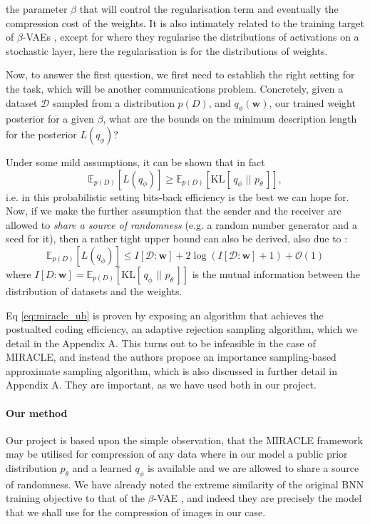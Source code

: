 \documentclass{article}
\renewcommand{\vec}[1]{\mathbf{#1}}
\newcommand{\Oh}{\mathcal{O}}
\newcommand{\KL}[2]{\mathrm{KL}[\,#1\,\,||\,\,#2\,]}
\newcommand{\Exp}{\mathbb{E}}
\newcommand{\Data}{\mathcal{D}}
\begin{document}
the parameter $\beta$ that will control the regularisation term and eventually
the compression cost of the weights. It is also intimately related to the
training target of $\beta$-VAEs \cite{higgins2017beta}, except for where they
regularise the distributions of activations on a stochastic layer, here the
regularisation is for the distributions of weights.
\par
Now, to answer the first question, we first need to establish the right setting
for the task, which will be another communications problem.
Concretely, given a dataset $\Data$ sampled from a distribution $p(D)$, and
$q_\phi(\vec{w})$, our trained weight posterior for a given $\beta$, what are
the bounds on the minimum description length for the posterior $L(q_{\phi})$?
\par
Under some mild assumptions, it can be shown \cite{harsha2007communication} that
in fact
\[
  \Exp_{p(D)}[L(q_{\phi})] \geq \Exp_{p(D)}[\KL{q_{\phi}}{p_{\theta}}],
\]
i.e. in this probabilistic setting bits-back efficiency is the best we can hope
for. Now, if we make the further assumption that the sender and the receiver are
allowed to \textit{share a source of randomness} (e.g. a random number generator
and a seed for it), then a rather tight upper bound can also be derived, also
due to \cite{harsha2007communication}:
\begin{equation}
\label{eq:miracle_ub}
  \Exp_{p(D)}[L(q_{\phi})] \leq I[\Data : \vec{w}] + 2 \log \left( I[\Data :
    \vec{w}] + 1 \right) + \Oh(1)
\end{equation}
where $I[D : \vec{w}] = \Exp_{p(D)}[\KL{q_{\phi}}{p_{\theta}}]$ is the
mutual information between the distribution of datasets and the weights.
\par
Eq \ref{eq:miracle_ub} is proven by exposing an algorithm that achieves the
postualted coding efficiency, an adaptive rejection sampling algorithm, which we
detail in the Appendix A. This turns out to be infeasible in the case of
MIRACLE, and instead the authors propose an importance sampling-based
approximate sampling algorithm, which is also discussed in further detail in
Appendix A. They are important, as we have used both in our project.

\paragraph{Our method} Our project is based upon the simple observation, that
the MIRACLE framework may be utilised for compression of any data where in our
model a public prior distribution $p_{\theta}$ and a learned $q_{\phi}$ is
available and we are allowed to share a source of randomness. We have already
noted the extreme similarity of the original BNN training objective to that of
the $\beta$-VAE \cite{higgins2017beta}, and indeed they are precisely the model
that we shall use for the compression of images in our case.
\end{document}
